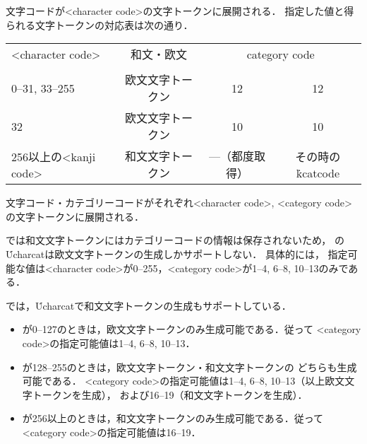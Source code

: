 \documentclass[a4paper,11pt,nomag]{jsarticle}
\begin{document}
\begin{cslist}
  文字コードが<character code>の文字トークンに展開される．
  指定した値と得られる文字トークンの対応表は次の通り．

  \begin{center}
	\small\medskip
	\begin{tabular}{lccc}
	  \toprule
	  <character code>&和文・欧文&\multicolumn{2}{c}{category code}\\\cmidrule(lr){3-4}
	  &&\epTeX&\eupTeX\\
	  \midrule
	  0--31, 33--255&欧文文字トークン&12&12\\
	  32            &欧文文字トークン&10&10\\
	  256以上の<kanji code>&和文文字トークン&---（都度取得）&その時の\.{kcatcode}\footnotemark\\
	  \bottomrule
	\end{tabular}
  \end{center}

  文字コード・カテゴリーコードがそれぞれ<character code>, <category code>の文字トークンに展開される．

  \epTeX では和文文字トークンにはカテゴリーコードの情報は保存されないため，
  \epTeX の\.{Ucharcat}は欧文文字トークンの生成しかサポートしない．
  具体的には，
  指定可能な値は<character code>が0--255，<category code>が1--4, 6--8, 10--13のみである．
\end{cslist}
\begin{dangerous}
  \eupTeX では，\.{Ucharcat}で和文文字トークンの生成もサポートしている．

  \medskip
  \begin{itemize}
	\item <character code>が0--127のときは，欧文文字トークンのみ生成可能である．従って
	<category code>の指定可能値は1--4, 6--8, 10--13．
	\item <character code>が128--255のときは，欧文文字トークン・和文文字トークンの
	どちらも生成可能である．
	<category code>の指定可能値は1--4, 6--8, 10--13（以上欧文文字トークンを生成），
	および16--19（和文文字トークンを生成）．
	\item <character code>が256以上のときは，和文文字トークンのみ生成可能である．従って
	<category code>の指定可能値は16--19．
  \end{itemize}
\end{dangerous}
\end{document}
